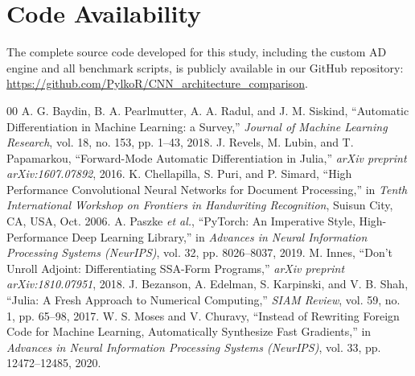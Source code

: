 \documentclass[conference]{IEEEtran}
\begin{document}
\section*{Code Availability}
The complete source code developed for this study, including the custom AD engine and all benchmark scripts, is publicly available in our GitHub repository: \url{https://github.com/PylkoR/CNN_architecture_comparison}.

\begin{thebibliography}{00}
A. G. Baydin, B. A. Pearlmutter, A. A. Radul, and J. M. Siskind, ``Automatic Differentiation in Machine Learning: a Survey,'' \emph{Journal of Machine Learning Research}, vol. 18, no. 153, pp. 1--43, 2018.
J. Revels, M. Lubin, and T. Papamarkou, ``Forward-Mode Automatic Differentiation in Julia,'' \emph{arXiv preprint arXiv:1607.07892}, 2016.
K. Chellapilla, S. Puri, and P. Simard, ``High Performance Convolutional Neural Networks for Document Processing,'' in \emph{Tenth International Workshop on Frontiers in Handwriting Recognition}, Suisun City, CA, USA, Oct. 2006.
A. Paszke \emph{et al.}, ``PyTorch: An Imperative Style, High-Performance Deep Learning Library,'' in \emph{Advances in Neural Information Processing Systems (NeurIPS)}, vol. 32, pp. 8026--8037, 2019.
M. Innes, ``Don't Unroll Adjoint: Differentiating SSA-Form Programs,'' \emph{arXiv preprint arXiv:1810.07951}, 2018.
J. Bezanson, A. Edelman, S. Karpinski, and V. B. Shah, ``Julia: A Fresh Approach to Numerical Computing,'' \emph{SIAM Review}, vol. 59, no. 1, pp. 65--98, 2017.
W. S. Moses and V. Churavy, ``Instead of Rewriting Foreign Code for Machine Learning, Automatically Synthesize Fast Gradients,'' in \emph{Advances in Neural Information Processing Systems (NeurIPS)}, vol. 33, pp. 12472--12485, 2020.
\end{thebibliography}
\end{document}
